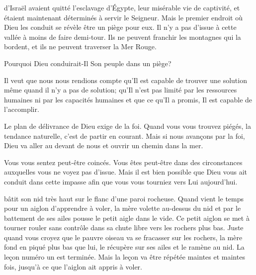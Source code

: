  d'Israël avaient quitté l'esclavage d'Égypte,
 leur misérable vie de captivité,
 et étaient maintenant déterminés à servir le Seigneur.
 Mais le premier endroit où Dieu les conduit se révèle être un piège pour eux.
 Il n'y a pas d'issue à cette vallée à moins de faire demi-tour.
 Ils ne peuvent franchir les montagnes qui la bordent,
 et ils ne peuvent traverser la Mer Rouge.

Pourquoi Dieu conduirait-Il Son peuple dans un piège?


Il veut que nous nous rendions compte qu'Il est capable de trouver une solution
 même quand il n'y a pas de solution;
 qu'Il n'est pas limité par les ressources humaines
 ni par les capacités humaines et que ce qu'Il a promis,
 Il est capable de l'accomplir.

Le plan de délivrance de Dieu exige de la foi.
 Quand vous vous trouvez piégés, la tendance naturelle,
 c'est de partir en courant.
 Mais si nous avançons par la foi,
 Dieu va aller au devant de nous et ouvrir un chemin dans la mer.

Vous vous sentez peut-être coincés.
 Vous êtes peut-être dans des circonstances
 auxquelles vous ne voyez pas d'issue.
 Mais il est bien possible que Dieu vous ait conduit dans cette impasse
 afin que vous vous tourniez vers Lui aujourd'hui. 

\dvrule






 bâtit son nid très haut
 sur le flanc d'une paroi rocheuse.
 Quand vient le temps pour un aiglon d'apprendre à voler,
 la mère volette au-dessus du nid et par le battement de ses ailes
 pousse le petit aigle dans le vide.
 Ce petit aiglon se met à tourner rouler sans contrôle
 dans sa chute libre vers les rochers plus bas.
 Juste quand vous croyez que le pauvre oiseau va se fracasser sur les rochers,
 la mère fond en piqué plus bas que lui, le récupère sur ses ailes
 et le ramène au nid.
 La leçon numéro un est terminée.
 Mais la leçon va être répétée maintes et maintes fois,
 jusqu'à ce que l'aiglon ait appris à voler.

